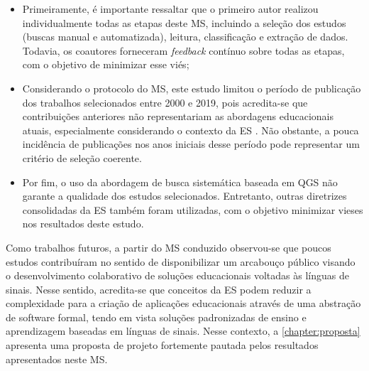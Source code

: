 \begin{itemize}
\item Primeiramente,  é importante ressaltar que o primeiro autor realizou individualmente todas as etapas deste MS, incluindo a seleção dos estudos (buscas manual e automatizada), leitura, classificação e extração de dados. Todavia, os coautores forneceram \textit{feedback} contínuo sobre todas as etapas, com o objetivo de minimizar esse viés; 
\item Considerando o protocolo do MS, este estudo limitou o período de publicação dos trabalhos selecionados entre 2000 e 2019, pois acredita-se que contribuições anteriores não representariam as abordagens educacionais atuais, especialmente considerando o contexto da ES \cite{Radermacher2013,Scatalon2019}. Não obstante, a pouca incidência de publicações nos anos iniciais desse período pode representar um critério de seleção coerente.
\item Por fim, o uso da abordagem de busca sistemática baseada em QGS não garante a qualidade dos estudos selecionados. Entretanto, outras diretrizes consolidadas da ES também foram utilizadas, com o objetivo minimizar vieses nos resultados deste estudo.
\end{itemize}

Como trabalhos futuros, a partir do MS conduzido observou-se que poucos estudos contribuíram no sentido de disponibilizar um arcabouço público visando o desenvolvimento colaborativo de soluções educacionais voltadas às línguas de sinais. Nesse sentido, acredita-se que conceitos da ES podem reduzir a complexidade para a criação de aplicações educacionais através de uma abstração de software formal, tendo em vista soluções padronizadas de ensino e aprendizagem baseadas em línguas de sinais. Nesse contexto, a \autoref{chapter:proposta} apresenta uma proposta de projeto fortemente pautada pelos resultados apresentados neste MS.